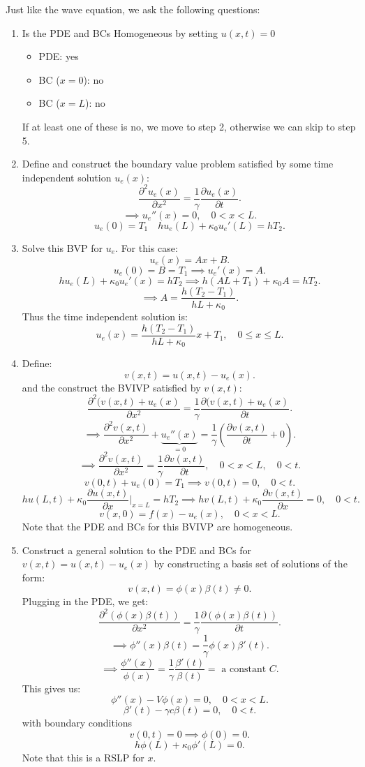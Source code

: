 \documentclass[../main/main.tex]{subfiles}
\begin{document}
Just like the wave equation, we ask the following questions: 
\begin{enumerate}
	\item Is the PDE and BCs Homogeneous by setting $u(x,t) = 0$
		\begin{itemize}
			\item PDE: yes
			\item BC ($x=0$): no
			\item BC ($x=L$): no
		\end{itemize}
	If at least one of these is no, we move to step 2, otherwise we can skip to step 5. 
\item Define and construct the boundary value problem satisfied by some time independent solution $u_e(x)$: \[
		\frac{\partial ^2 u_e(x)}{\partial x^2}  = \frac{1}{\gamma} \frac{\partial u_e(x)}{\partial t} 
.\] \[
\implies u_e''(x) = 0, \quad 0 < x < L
.\] \[
u_e(0) = T_1 \quad hu_e(L) + \kappa_0 u_e'(L) = hT_2
.\] 
\item Solve this BVP for $u_e$. For this case: \[
		u_e(x) = Ax + B
.\] \[
u_e(0) = B = T_1 \implies u_e'(x) = A
.\] \[
h u_e(L) + \kappa_0 u_e'(x) = h T_2 \implies h(AL+T_1) + \kappa_0 A = hT_2
.\] \[
\implies A = \frac{h(T_2-T_1)}{hL+\kappa_0}
.\] Thus the time independent solution is: \[
u_e(x) = \frac{h(T_2-T_1)}{hL+\kappa_0}x + T_1, \quad 0 \le  x \le  L
.\] 
\item Define: \[
		v(x,t) = u(x,t) - u_e(x)
	.\] and the construct the BVIVP satisfied by $v(x,t)$: \[
	\frac{\partial ^2(v(x,t)+u_e(x)}{\partial x^2} = \frac{1}{\gamma}\frac{\partial (v(x,t)+u_e(x)}{\partial t} 
	.\] \[
	\implies \frac{\partial ^2 v(x,t)}{\partial x^2} +\underbrace{u_e''(x)}_{=0} = \frac{1}{\gamma} \left( \frac{\partial v(x,t)}{\partial t} +0 \right) 
	.\] \[
	\implies \frac{\partial ^2 v(x,t)}{\partial x^2} = \frac{1}{\gamma}\frac{\partial v(x,t)}{\partial t} , \quad 0 < x < L, \quad 0 < t
	.\]\[
	v(0,t) + u_e(0) = T_1 \implies v(0,t) = 0, \quad 0 < t
	.\] \[
h u(L,t) + \kappa_0 \frac{\partial u(x,t)}{\partial x} \bigg\rvert_{x=L} = hT_2 \implies h v(L,t) + \kappa_0 \frac{\partial v(x,t)}{\partial x}  = 0, \quad 0 < t
	.\] \[
	v(x,0) = f(x) - u_e (x) , \quad 0 < x < L
	.\] Note that the PDE and BCs for this BVIVP are homogeneous. 
\item Construct a general solution to the PDE and BCs for $v(x,t) = u(x,t) - u_e(x)$ by constructing a basis set of solutions of the form:  \[
		v(x,t) = \phi(x) \beta(t) \neq 0
.\] Plugging in the PDE, we get: \[
\frac{\partial ^2 \left( \phi(x)\beta(t) \right) }{\partial x^2} = \frac{1}{\gamma} \frac{\partial \left( \phi(x)\beta(t) \right) }{\partial t}  
.\] \[
\implies \phi''(x) \beta(t) = \frac{1}{\gamma}\phi(x) \beta'(t)
.\] \[
\implies \frac{\phi''(x)}{\phi(x) }= \frac{1}{\gamma} \frac{\beta'(t)}{\beta(t)} = \text{ a constant }C
.\] This gives us: \[
\phi''(x) - V \phi(x) = 0, \quad 0 < x < L
.\]  \[
\beta'(t) - \gamma c \beta(t) = 0 , \quad 0 < t
.\]with boundary conditions \[
v(0,t) = 0 \implies \phi(0) = 0
.\] \[
h \phi(L) + \kappa_0 \phi'(L) = 0
.\] Note that this is a RSLP for $x$.


\end{enumerate}
\end{document}
